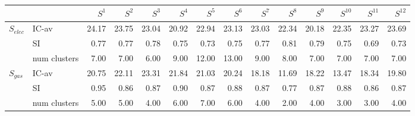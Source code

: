 \begin{tabular}{llrrrrrrrrrrrr}
\toprule
 &  & $S^{1}$ & $S^{2}$ & $S^{3}$ & $S^{4}$ & $S^{5}$ & $S^{6}$ & $S^{7}$ & $S^{8}$ & $S^{9}$ & $S^{10}$ & $S^{11}$ & $S^{12}$ \\
\midrule
\multirow[c]{3}{*}{$S_{elec}$} & IC-av & 24.17 & 23.75 & 23.04 & 20.92 & 22.94 & 23.13 & 23.03 & 22.34 & 20.18 & 22.35 & 23.27 & 23.69 \\
 & SI & 0.77 & 0.77 & 0.78 & 0.75 & 0.73 & 0.75 & 0.77 & 0.81 & 0.79 & 0.75 & 0.69 & 0.73 \\
 & num clusters & 7.00 & 7.00 & 6.00 & 9.00 & 12.00 & 13.00 & 9.00 & 8.00 & 7.00 & 7.00 & 7.00 & 7.00 \\
\multirow[c]{3}{*}{$S_{gas}$} & IC-av & 20.75 & 22.11 & 23.31 & 21.84 & 21.03 & 20.24 & 18.18 & 11.69 & 18.22 & 13.47 & 18.34 & 19.80 \\
 & SI & 0.95 & 0.86 & 0.87 & 0.90 & 0.87 & 0.88 & 0.87 & 0.77 & 0.87 & 0.88 & 0.86 & 0.87 \\
 & num clusters & 5.00 & 5.00 & 4.00 & 6.00 & 7.00 & 6.00 & 4.00 & 2.00 & 4.00 & 3.00 & 3.00 & 4.00 \\
\bottomrule
\end{tabular}
